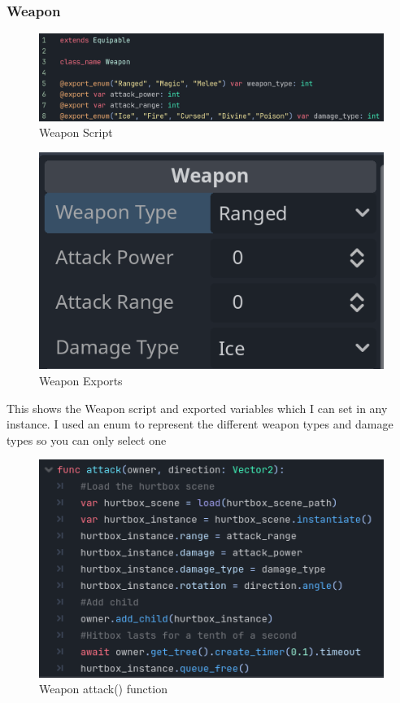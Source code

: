 \documentclass{article}
\begin{document}
        \subsubsection{Weapon}
        \begin{multicols}{2}
                \begin{figure}[H]
                        \centering
                        \includegraphics[width = \columnwidth]{images/development/Weapon_script.PNG}
                        \caption{Weapon Script}
                \end{figure}
                \begin{figure}[H]
                        \centering
                        \includegraphics[width = 0.9\columnwidth]{images/development/Weapon_export.PNG}
                        \caption{Weapon Exports}
                \end{figure}
        \end{multicols}
        \[\]
        This shows the Weapon script and exported variables which I can set in any instance. I used an enum to represent the different weapon types and damage types so you can only select one
        \begin{figure}[H]
                \centering
                \includegraphics[width = 0.8\columnwidth]{images/development/Weapon_attack.PNG}
                \caption{Weapon attack() function}
        \end{figure}
\end{document}
